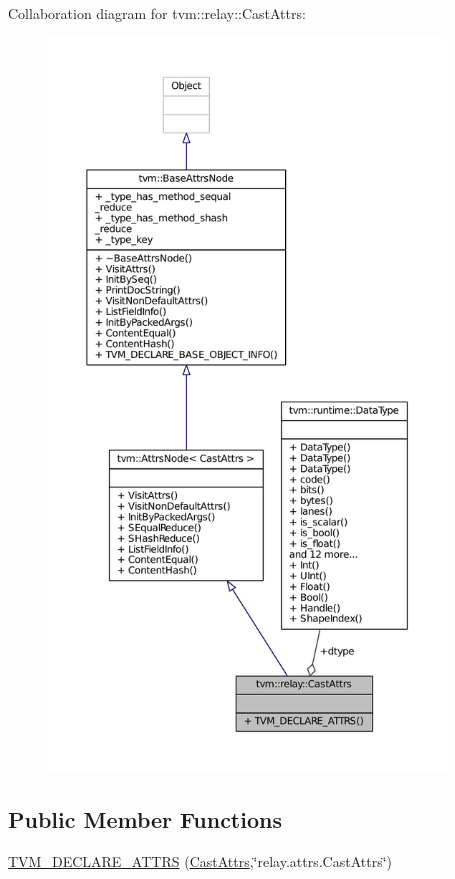 Collaboration diagram for tvm\+:\+:relay\+:\+:Cast\+Attrs\+:
\nopagebreak
\begin{figure}[H]
\begin{center}
\leavevmode
\includegraphics[height=550pt]{structtvm_1_1relay_1_1CastAttrs__coll__graph}
\end{center}
\end{figure}
\subsection*{Public Member Functions}
\begin{DoxyCompactItemize}
\item 
\hyperlink{structtvm_1_1relay_1_1CastAttrs_a267b6de7f8e6aaf6329b60d86204e897}{T\+V\+M\+\_\+\+D\+E\+C\+L\+A\+R\+E\+\_\+\+A\+T\+T\+RS} (\hyperlink{structtvm_1_1relay_1_1CastAttrs}{Cast\+Attrs},\char`\"{}relay.\+attrs.\+Cast\+Attrs\char`\"{})
\end{DoxyCompactItemize}
